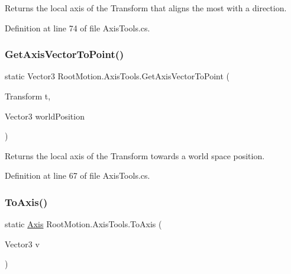 Returns the local axis of the Transform that aligns the most with a direction. 



Definition at line 74 of file Axis\+Tools.\+cs.

\mbox{\label{class_root_motion_1_1_axis_tools_aff4deb6c334be7a49541ab78100aa813}} 
\subsubsection{\texorpdfstring{Get\+Axis\+Vector\+To\+Point()}{GetAxisVectorToPoint()}}
{\footnotesize\ttfamily static Vector3 Root\+Motion.\+Axis\+Tools.\+Get\+Axis\+Vector\+To\+Point (\begin{DoxyParamCaption}\item[{Transform}]{t,  }\item[{Vector3}]{world\+Position }\end{DoxyParamCaption})\hspace{0.3cm}{\ttfamily [static]}}



Returns the local axis of the Transform towards a world space position. 



Definition at line 67 of file Axis\+Tools.\+cs.

\mbox{\label{class_root_motion_1_1_axis_tools_a97f5d537cd24302aface3eb47624adc1}} 
\subsubsection{\texorpdfstring{To\+Axis()}{ToAxis()}}
{\footnotesize\ttfamily static \mbox{\hyperlink{namespace_root_motion_a824e68ffa644559736d5e0bc80919a87}{Axis}} Root\+Motion.\+Axis\+Tools.\+To\+Axis (\begin{DoxyParamCaption}\item[{Vector3}]{v }\end{DoxyParamCaption})\hspace{0.3cm}{\ttfamily [static]}}



